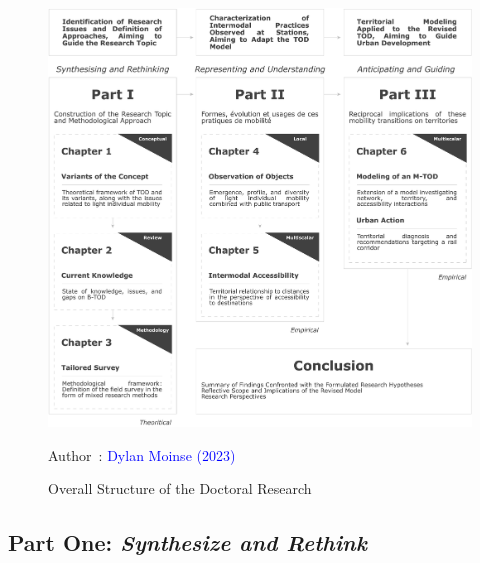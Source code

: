 \begin{refsegment}
    \begin{figure}[h!]\vspace*{4pt}
        \caption{Overall Structure of the Doctoral Research}
        \label{fig-introduction:structure-these}
        \centerline{\includegraphics[width=1\columnwidth]{src/Figures/Introduction/EN_Structure_these.pdf}}
        \vspace{5pt}
        \begin{flushright}\scriptsize{
        Author~: \textcolor{blue}{Dylan Moinse (2023)}
        }\end{flushright}
    \end{figure}

\subsection*{Part One: \textsl{Synthesize and Rethink}
    \label{introduction-generale:annonce-plan-1}
    }


\end{refsegment}
